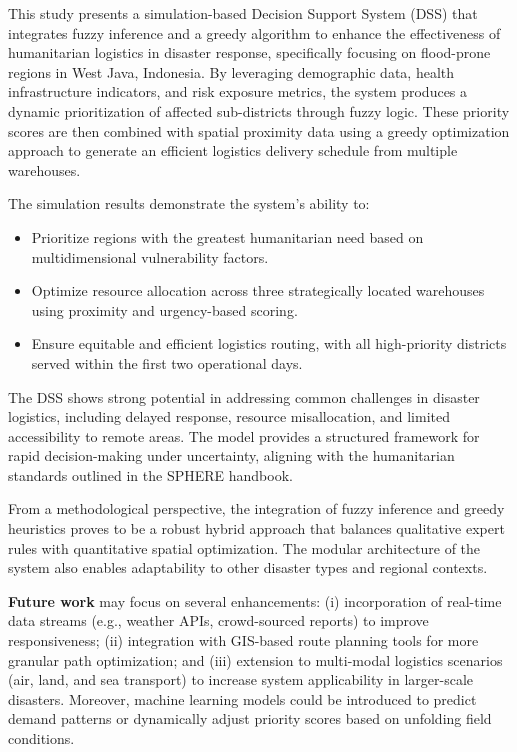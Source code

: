 \documentclass[journal,final,a4paper,twoside,11pt]{IEEEtran}
\begin{document}
This study presents a simulation-based Decision Support System (DSS) that integrates fuzzy inference and a greedy algorithm to enhance the effectiveness of humanitarian logistics in disaster response, specifically focusing on flood-prone regions in West Java, Indonesia. By leveraging demographic data, health infrastructure indicators, and risk exposure metrics, the system produces a dynamic prioritization of affected sub-districts through fuzzy logic. These priority scores are then combined with spatial proximity data using a greedy optimization approach to generate an efficient logistics delivery schedule from multiple warehouses.

The simulation results demonstrate the system's ability to:
\begin{itemize}
    \item Prioritize regions with the greatest humanitarian need based on multidimensional vulnerability factors.
    \item Optimize resource allocation across three strategically located warehouses using proximity and urgency-based scoring.
    \item Ensure equitable and efficient logistics routing, with all high-priority districts served within the first two operational days.
\end{itemize}

The DSS shows strong potential in addressing common challenges in disaster logistics, including delayed response, resource misallocation, and limited accessibility to remote areas. The model provides a structured framework for rapid decision-making under uncertainty, aligning with the humanitarian standards outlined in the SPHERE handbook.

From a methodological perspective, the integration of fuzzy inference and greedy heuristics proves to be a robust hybrid approach that balances qualitative expert rules with quantitative spatial optimization. The modular architecture of the system also enables adaptability to other disaster types and regional contexts.

\textbf{Future work} may focus on several enhancements: (i) incorporation of real-time data streams (e.g., weather APIs, crowd-sourced reports) to improve responsiveness; (ii) integration with GIS-based route planning tools for more granular path optimization; and (iii) extension to multi-modal logistics scenarios (air, land, and sea transport) to increase system applicability in larger-scale disasters. Moreover, machine learning models could be introduced to predict demand patterns or dynamically adjust priority scores based on unfolding field conditions.
\end{document}

